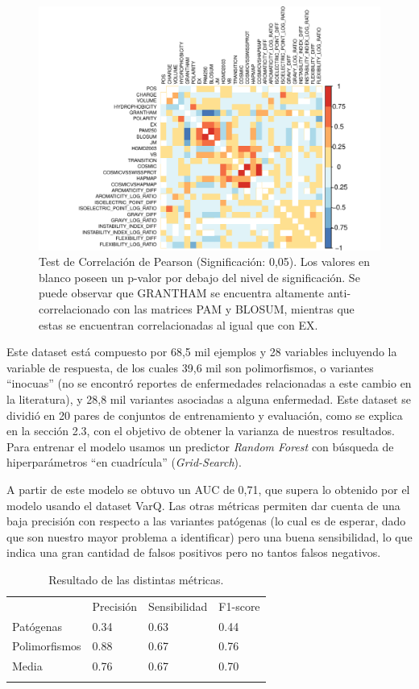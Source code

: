 \begin{figure}[H]
    \centering
    \includegraphics[scale=0.8]{documents/latex/figures/3/corrplot_1.pdf}
    \caption{Test de Correlación de Pearson (Significación: 0,05). Los valores en blanco poseen un p-valor por debajo del nivel de significación. Se puede observar que GRANTHAM se encuentra altamente anti-correlacionado con las matrices PAM y BLOSUM, mientras que estas se encuentran correlacionadas al igual que con EX.}
    \label{fig:corrplot_1}
\end{figure}

Este dataset está compuesto por 68,5 mil ejemplos y 28 variables incluyendo la variable de respuesta, de los cuales 39,6 mil son polimorfismos, o variantes ``inocuas'' (no se encontró reportes de enfermedades relacionadas a este cambio en la literatura), y 28,8 mil variantes asociadas a alguna enfermedad. Este dataset se dividió en 20 pares de conjuntos de entrenamiento y evaluación, como se explica en la sección 2.3, con el objetivo de obtener la varianza de nuestros resultados. 
Para entrenar el modelo usamos un predictor \textit{Random Forest} con búsqueda de hiperparámetros ``en cuadrícula'' (\textit{Grid-Search}). 

A partir de este modelo se obtuvo un AUC de 0,71, que supera lo obtenido por el modelo usando el dataset VarQ. Las otras métricas permiten dar cuenta de una baja precisión con respecto a las variantes patógenas (lo cual es de esperar, dado que son nuestro mayor problema a identificar) pero una buena sensibilidad, lo que indica una gran cantidad de falsos positivos pero no tantos falsos negativos.

\begin{table}[H]
\centering
\begin{tabular}{llll}
              & Precisión & Sensibilidad & F1-score \\
Patógenas     & 0.34      & 0.63   & 0.44     \\
Polimorfismos & 0.88      & 0.67   & 0.76     \\
Media         & 0.76      & 0.67   & 0.70     \\
              &           &        &         
\end{tabular}
\caption{Resultado de las distintas métricas.}
\label{my-label}
\end{table}

